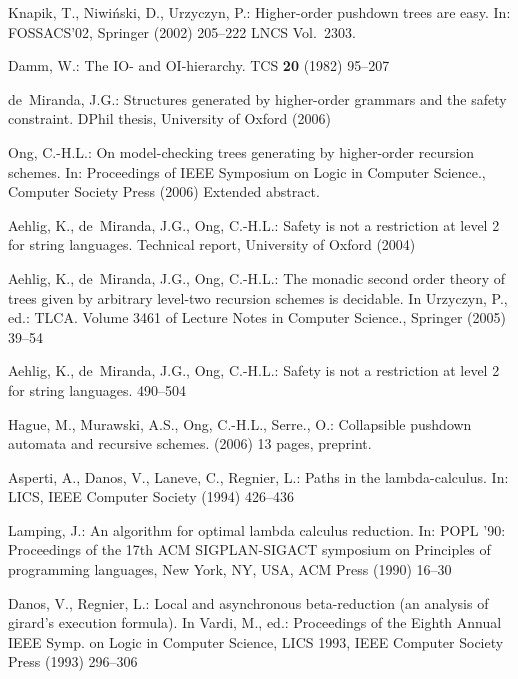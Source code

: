 \documentclass{llncs}
\begin{document}
\begin{thebibliography}{10}

Knapik, T., Niwi{\'n}ski, D., Urzyczyn, P.:
\newblock Higher-order pushdown trees are easy.
\newblock In: FOSSACS'02, Springer (2002)  205--222 LNCS Vol.~2303.

Damm, W.:
\newblock The {IO-} and {OI}-hierarchy.
\newblock TCS \textbf{20} (1982)  95--207

de~Miranda, J.G.:
\newblock Structures generated by higher-order grammars and the safety
  constraint.
\newblock DPhil thesis, University of Oxford (2006)

Ong, C.-H.L.:
\newblock On model-checking trees generating by higher-order recursion schemes.
\newblock In: Proceedings of IEEE Symposium on Logic in Computer Science.,
  Computer Society Press (2006) Extended abstract.

Aehlig, K., de~Miranda, J.G., Ong, C.-H.L.:
\newblock Safety is not a restriction at level 2 for string languages.
\newblock Technical report, University of Oxford (2004)

Aehlig, K., de~Miranda, J.G., Ong, C.-H.L.:
\newblock The monadic second order theory of trees given by arbitrary level-two
  recursion schemes is decidable.
\newblock In Urzyczyn, P., ed.: TLCA. Volume 3461 of Lecture Notes in Computer
  Science., Springer (2005)  39--54

Aehlig, K., de~Miranda, J.G., Ong, C.-H.L.:
\newblock Safety is not a restriction at level 2 for string languages.
\newblock  \cite{DBLP:conf/fossacs/2005}  490--504

Hague, M., Murawski, A.S., Ong, C.-H.L., Serre., O.:
\newblock Collapsible pushdown automata and recursive schemes.
\newblock (2006) 13 pages, preprint.

Asperti, A., Danos, V., Laneve, C., Regnier, L.:
\newblock Paths in the lambda-calculus.
\newblock In: LICS, IEEE Computer Society (1994)  426--436

Lamping, J.:
\newblock An algorithm for optimal lambda calculus reduction.
\newblock In: POPL '90: Proceedings of the 17th ACM SIGPLAN-SIGACT symposium on
  Principles of programming languages, New York, NY, USA, ACM Press (1990)
  16--30

Danos, V., Regnier, L.:
\newblock Local and asynchronous beta-reduction (an analysis of girard's
  execution formula).
\newblock In Vardi, M., ed.: Proceedings of the Eighth Annual IEEE Symp. on
  Logic in Computer Science, {LICS} 1993, IEEE Computer Society Press (1993)
  296--306


\end{thebibliography}
\end{document}
